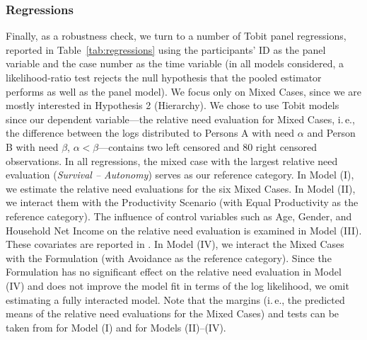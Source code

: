 \documentclass[10pt,letterpaper]{article}
\begin{document}
\subsubsection*{Regressions}\label{sec:results_regressions}
Finally, as a robustness check, we turn to a number of Tobit panel regressions, reported in Table~\ref{tab:regressions} using the participants' ID as the panel variable and the case number as the time variable (in all models considered, a likelihood-ratio test rejects the null hypothesis that the pooled estimator performs as well as the panel model).
We focus only on Mixed Cases, since we are mostly interested in Hypothesis 2 (Hierarchy).
We chose to use Tobit models since our dependent variable---the relative need evaluation for Mixed Cases, i.\,e., the difference between the logs distributed to Persons A with need $\alpha$ and Person B with need $\beta$, $\alpha<\beta$---contains two left censored and $80$ right censored observations.
In all regressions, the mixed case with the largest relative need evaluation (\textit{Survival -- Autonomy}) serves as our reference category.
In Model (I), we estimate the relative need evaluations for the six Mixed Cases.
In Model (II), we interact them with the Productivity Scenario (with Equal Productivity as the reference category).
The influence of control variables such as Age, Gender, and Household Net Income on the relative need evaluation is examined in Model (III).
These covariates are reported in .
In Model (IV), we interact the Mixed Cases with the Formulation (with Avoidance as the reference category).
Since the Formulation has no significant effect on the relative need evaluation in Model (IV) and does not improve the model fit in terms of the log likelihood, we omit estimating a fully interacted model.
Note that the margins (i.\,e., the predicted means of the relative need evaluations for the Mixed Cases) and tests can be taken from  for Model (I) and  for Models (II)--(IV).
\end{document}

